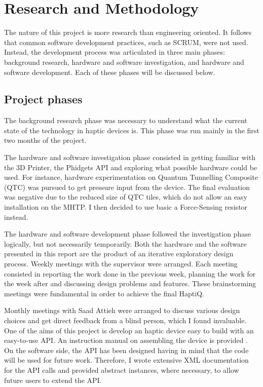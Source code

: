 \chapter{Research and Methodology}

The nature of this project is more research than engineering oriented. It follows that common software development practices, such as SCRUM, were not used. Instead, the development process was articulated in three main phases: background research, hardware and software investigation, and hardware and software development. Each of these phases will be discussed below. 

\section{Project phases}
The background research phase was necessary to understand what the current state of the technology in haptic devices is. This phase was run mainly in the first two months of the project. 

The hardware and software investigation phase consisted in getting familiar with the 3D Printer, the Phidgets API and exploring what possible hardware could be used. For instance, hardware experimentation on Quantum Tunnelling Composite (QTC) was pursued to get pressure input from the device. The final evaluation was negative due to the reduced size of QTC tiles, which do not allow an easy installation on the MHTP. I then decided to use basic a Force-Sensing resistor instead. 

The hardware and software development phase followed the investigation phase logically, but not necessarily temporarily. Both the hardware and the software presented in this report are the product of an iterative exploratory design process. Weekly meetings with the supervisor were arranged. Each meeting consisted in reporting the work done in the previous week, planning the work for the week after and discussing design problems and features. These brainstorming meetings were fundamental in order to achieve the final HaptiQ.

Monthly meetings with Saad Attieh were arranged to discuss various design choices and get direct feedback from a blind person, which I found invaluable. 
One of the aims of this project is develop an haptic device easy to build with an easy-to-use API. An instruction manual on assembling the device is provided . On the software side, the API has been designed having in mind that the code will be used for future work. Therefore, I wrote extensive XML documentation for the API calls and provided abstract instances, where necessary, to allow future users to extend the API. 

